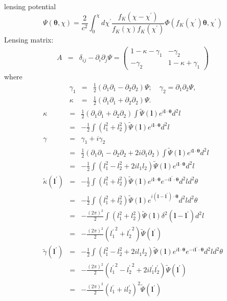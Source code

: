 \documentclass[twocolumn]{aastex62}
\begin{document}
lensing potential
\begin{equation}
\Psi(\boldsymbol{\theta},\chi) =\frac{2}{c^2}\int_0^{\chi} d\chi^{\prime} \frac{f_K(\chi - \chi^{\prime})}{f_K(\chi)f_K(\chi^{\prime})}\Phi(f_K(\chi^{\prime})\boldsymbol{\theta}, \chi^{\prime}) 
\end{equation}
Lensing matrix:
\begin{eqnarray}
A&=&\delta_{ij} - \partial_i \partial_j \Psi =
\left(
\begin{array}{cc}1-\kappa - \gamma_1 &  - \gamma_2\\ 
- \gamma_2 & 1-\kappa + \gamma_1
\end{array}
\right)
\end{eqnarray}
where
\begin{eqnarray}
\gamma_1 &=& \frac{1}{2}(\partial_1\partial_1 - \partial_2\partial_2)\Psi;\quad 
\gamma_2 = \partial_1\partial_2 \Psi,\\ \nonumber
\kappa &=& \frac{1}{2}(\partial_1\partial_1 + \partial_2\partial_2)\Psi.
\end{eqnarray}
\begin{eqnarray}
\kappa &=& \frac{1}{2}(\partial_1\partial_1 + \partial_2\partial_2)\int \tilde{\Psi}(\boldsymbol{l})e^{i\boldsymbol{l}\cdot\boldsymbol{\theta}}d^2l  \\ \nonumber
&=& -\frac{1}{2}\int (l_1^2+l_2^2)\tilde{\Psi}(\boldsymbol{l})e^{i\boldsymbol{l}\cdot\boldsymbol{\theta}}d^2l \\ \nonumber
\gamma &=& \gamma_1 + i\gamma_2\\ \nonumber
&=&\frac{1}{2}(\partial_1\partial_1 - \partial_2\partial_2 + 2i \partial_1\partial_2)\int \tilde{\Psi}(\boldsymbol{l})e^{i\boldsymbol{l}\cdot\boldsymbol{\theta}}d^2l  \\ \nonumber
&=&  -\frac{1}{2}\int (l_1^2 -l_2^2 + 2il_1l_2)\tilde{\Psi}(\boldsymbol{l})e^{i\boldsymbol{l}\cdot\boldsymbol{\theta}}d^2l  \\ \nonumber
\tilde{\kappa}(\boldsymbol{l^{\prime}}) &=&-\frac{1}{2}\int (l_1^2+l_2^2)\tilde{\Psi}(\boldsymbol{l})e^{i\boldsymbol{l}\cdot\boldsymbol{\theta}}e^{-i\boldsymbol{l^{\prime}}\cdot\boldsymbol{\theta}}d^2ld^2\theta \\ \nonumber
&=&-\frac{1}{2}\int (l_1^2+l_2^2)\tilde{\Psi}(\boldsymbol{l})e^{i(\boldsymbol{l} - \boldsymbol{l^{\prime}})\cdot\boldsymbol{\theta}}d^2ld^2\theta \\ \nonumber
&=&-\frac{(2\pi)^2}{2}\int (l_1^2+l_2^2)\tilde{\Psi}(\boldsymbol{l})\delta^2(\boldsymbol{l} - \boldsymbol{l^{\prime}})d^2l \\ \nonumber
&=&-\frac{(2\pi)^2}{2}({l_1^{\prime}}^2+{l_2^{\prime}}^2)\tilde{\Psi}(\boldsymbol{l^{\prime}}) \\ \nonumber
\tilde{\gamma}(\boldsymbol{l^{\prime}}) &=&  -\frac{1}{2}\int (l_1^2 -l_2^2 + 2il_1l_2)\tilde{\Psi}(\boldsymbol{l})e^{i\boldsymbol{l}\cdot\boldsymbol{\theta}}e^{-i\boldsymbol{l^{\prime}}\cdot\boldsymbol{\theta}}d^2ld^2\theta \\ \nonumber
&=& -\frac{(2\pi)^2}{2}({l_1^{\prime}}^2-{l_2^{\prime}}^2 + 2il_1^{\prime}l_2^{\prime} )\tilde{\Psi}(\boldsymbol{l^{\prime}}) \\ \nonumber
&=& -\frac{(2\pi)^2}{2}(l_1^{\prime} +il_2^{\prime} )^2\tilde{\Psi}(\boldsymbol{l^{\prime}})
\end{eqnarray}
\end{document}
